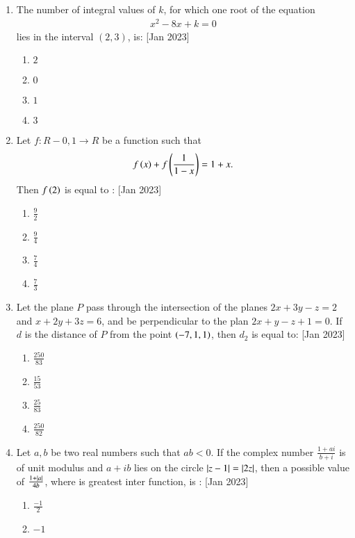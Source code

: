\documentclass[journal]{IEEEtran}
\begin{document}
\begin{enumerate}
	\item The number of integral values of $k$, for which one root of the equation 
              \begin{align*}
		x^2-8x+k=0
              \end{align*}
		      lies in the interval $(2,3)$, is:
		      	\hfill{[Jan 2023]}
		\begin{enumerate}
			\item $2$
			\item $0$
			\item $1$
			\item $3$
        	\end{enumerate}
	\item Let $f:R-{0,1} \rightarrow R$ be a function such that 
             \begin{align*}
		f\left(x\right)+f\left(\frac{1}{1-x}\right)=1+x.
             \end{align*}
		Then $f\left(2\right)$ is equal to :
			\hfill{[Jan 2023]}
		\begin{enumerate}
			\item $\frac{9}{2}$
                        \item $\frac{9}{4}$
                        \item $\frac{7}{4}$
                        \item $\frac{7}{3}$
        	\end{enumerate}	
	\item  Let the plane $P$ pass through the intersection of the planes $2x+3y-z=2$ and $x+2y+3z=6$, and be perpendicular to the plan $2x+y-z+1=0$. If $d$ is the distance of $P$ from the point $\left(-7,1,1\right)$, then $d_2$ is equal to:
		\hfill{[Jan 2023]}
		\begin{enumerate}
			\item $\frac{250}{83}$
			\item $\frac{15}{53}$
			\item $\frac{25}{83}$
			\item $\frac{250}{82}$
        	\end{enumerate}	
	\item Let $a, b$ be two real numbers such that $ab<0$. If the complex number $\frac{1+ai}{b+i}$ is of unit modulus and $a+ib $ lies on the circle $\left\vert z-1\right\vert=\left\vert2z\right\vert$, then a possible value of $\frac{1+\left\vert a\right\vert}{4b}$, where  is greatest inter function, is : 
	\hfill{[Jan 2023]}
                \begin{enumerate}
			\item $\frac{-1}{2}$
			\item $-1$

\end{enumerate}
\end{enumerate}
\end{document}

